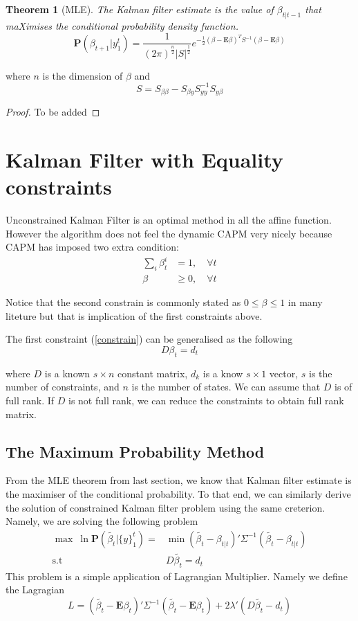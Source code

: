 \documentclass{article}
\theoremstyle{plain}
\newtheorem{thm}{Theorem}[section]
\theoremstyle{definition}
\theoremstyle{remark}
\newcommand{\E}{\mathbf{E}}
\newcommand{\PP}{\mathbf{P}}
\begin{document}
\begin{thm}[MLE]
The Kalman filter estimate is the value of $\beta_{t|t-1}$ that maXimises the conditional probability density function.
\[
\PP(\beta_{t+1} | y_1^t) = \frac1{(2\pi)^\frac n2 |S|^{\frac12}} e^{-\frac12(\beta - \E \beta)^T S^{-1} (\beta - \E \beta)}
\]
\end{thm}
where $n$ is the dimension of $\beta$ and 
\[
S = S_{\beta \beta} - S_{\beta y} S^{-1}_{y y} S_{y\beta }
\] 
\begin{proof}
To be added
\end{proof}


\section{Kalman Filter with Equality constraints}

Unconstrained Kalman Filter is an optimal method in all the affine function. However the algorithm does not feel the dynamic CAPM very nicely because CAPM has imposed two extra condition:
\begin{equation}
\begin{split}
\sum_{i} \beta^i_t &= 1, \quad \forall t\\
\beta &\geq 0, \quad \forall t
\end{split}
\label{constrain}
\end{equation}

Notice that the second constrain is commonly stated as $0 \leq \beta \leq 1$ in many liteture but that is implication of the first constraints above. 

The first constraint (\ref{constrain}) can be generalised as the following 
\[
D \beta_t = d_t
\]

where $D$ is a known $s \times n$ constant matrix, $d_k$ is a know $s \times 1$ vector, $s$ is the number of constraints, and $n$ is the number of states. We can assume that $D$ is of full rank. If $D$ is not full rank, we can reduce the constraints to obtain full rank matrix.

\subsection{The Maximum Probability Method}
From the MLE theorem from last section, we know that Kalman filter estimate is the maximiser of the conditional probability. To that end, we can similarly derive the solution of constrained Kalman filter problem using the same creterion. Namely, we are solving the following problem
\begin{equation}
\begin{split}
\max \: \ln \PP(\tilde{\beta_t} | \{y\}^t_1) = &\min (\tilde{\beta_t}  - \beta_{t|t})' \Sigma^{-1} (\tilde{\beta_t}  - \beta_{t|t})\\
\text{s.t }&D\tilde{\beta_t} = d_t
\end{split}
\end{equation}
This problem is a  simple application of Lagrangian Multiplier. Namely we define the Lagragian
\[
L = (\tilde{\beta_t}  - \E{\beta_t})' \Sigma^{-1} (\tilde{\beta_t}  - \E{\beta_t}) + 2 \lambda' (D\tilde{\beta_t} - d_t)
\]
\end{document}
